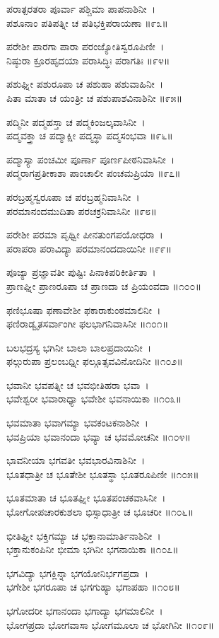 ಪರಾತ್ಪರತರಾ ಪೂರ್ವಾ ಪಶ್ಚಿಮಾ ಪಾಪನಾಶಿನೀ~।\\
ಪಶೂನಾಂ ಪತಿಪತ್ನೀ ಚ ಪತಿಭಕ್ತಿಪರಾಯಣಾ ॥೯೩॥

ಪರೇಶೀ ಪಾರಗಾ ಪಾರಾ ಪರಂಜ್ಯೋತಿಸ್ವರೂಪಿಣೀ~।\\
ನಿಷ್ಠುರಾ ಕ್ರೂರಹೃದಯಾ ಪರಾಸಿದ್ಧಿಃ ಪರಾಗತಿಃ ॥೯೪॥

ಪಶುಘ್ನೀ ಪಶುರೂಪಾ ಚ ಪಶುಹಾ ಪಶುವಾಹಿನೀ~।\\
ಪಿತಾ ಮಾತಾ ಚ ಯಂತ್ರೀ ಚ ಪಶುಪಾಶವಿನಾಶಿನೀ ॥೯೫॥

ಪದ್ಮಿನೀ ಪದ್ಮಹಸ್ತಾ ಚ ಪದ್ಮಕಿಂಜಲ್ಕವಾಸಿನೀ~।\\
ಪದ್ಮವಕ್ತ್ರಾ ಚ ಪದ್ಮಾಕ್ಷೀ ಪದ್ಮಸ್ಥಾ ಪದ್ಮಸಂಭವಾ ॥೯೬॥

ಪದ್ಮಾಸ್ಯಾ ಪಂಚಮೀ ಪೂರ್ಣಾ ಪೂರ್ಣಪೀಠನಿವಾಸಿನೀ~।\\
ಪದ್ಮರಾಗಪ್ರತೀಕಾಶಾ ಪಾಂಚಾಲೀ ಪಂಚಮಪ್ರಿಯಾ ॥೯೭॥

ಪರಬ್ರಹ್ಮಸ್ವರೂಪಾ ಚ ಪರಬ್ರಹ್ಮನಿವಾಸಿನೀ~।\\
ಪರಮಾನಂದಮುದಿತಾ ಪರಚಕ್ರನಿವಾಸಿನೀ ॥೯೮॥

ಪರೇಶೀ ಪರಮಾ ಪೃಥ್ವೀ ಪೀನತುಂಗಪಯೋಧರಾ~।\\
ಪರಾಪರಾ ಪರಾವಿದ್ಯಾ ಪರಮಾನಂದದಾಯಿನೀ ॥೯೯॥

ಪೂಜ್ಯಾ ಪ್ರಜ್ಞಾವತೀ ಪುಷ್ಟಿಃ ಪಿನಾಕಿಪರಿಕೀರ್ತಿತಾ~।\\
ಪ್ರಾಣಘ್ನೀ ಪ್ರಾಣರೂಪಾ ಚ ಪ್ರಾಣದಾ ಚ ಪ್ರಿಯಂವದಾ ॥೧೦೦॥

ಫಣಿಭೂಷಾ ಫಣಾವೇಶೀ ಫಕಾರಾಕುಂಠಮಾಲಿನೀ~।\\
ಫಣಿರಾಡ್ವೃತಸರ್ವಾಂಗೀ ಫಲಭಾಗನಿವಾಸಿನೀ ॥೧೦೧॥

ಬಲಭದ್ರಸ್ಯ ಭಗಿನೀ ಬಾಲಾ ಬಾಲಪ್ರದಾಯಿನೀ~।\\
ಫಲ್ಗುರುಪಾ ಪ್ರಲಂಬಧ್ನೀ ಫಲ್ಗೂತ್ಸವವಿನೋದಿನೀ ॥೧೦೨॥

ಭವಾನೀ ಭವಪತ್ನೀ ಚ ಭವಭೀತಿಹರಾ ಭವಾ~।\\
ಭವೇಶ್ವರೀ ಭವಾರಾಧ್ಯಾ ಭವೇಶೀ ಭವನಾಯಿಕಾ ॥೧೦೩॥

ಭವಮಾತಾ ಭವಾಗಮ್ಯಾ ಭವಕಂಟಕನಾಶಿನೀ~।\\
ಭವಪ್ರಿಯಾ ಭವಾನಂದಾ ಭವ್ಯಾ ಚ ಭವಮೋಚನೀ ॥೧೦೪॥

ಭಾವನೀಯಾ ಭಗವತೀ ಭವಭಾರವಿನಾಶಿನೀ~।\\
ಭೂತಧಾತ್ರೀ ಚ ಭೂತೇಶೀ ಭೂತಸ್ಥಾ ಭೂತರೂಪಿಣೀ ॥೧೦೫॥

ಭೂತಮಾತಾ ಚ ಭೂತಘ್ನೀ ಭೂತಪಂಚಕವಾಸಿನೀ~।\\
ಭೋಗೋಪಚಾರಕುಶಲಾ ಭಿಸ್ಸಾಧಾತ್ರೀ ಚ ಭೂಚರೀ ॥೧೦೬॥

ಭೀತಿಘ್ನೀ ಭಕ್ತಿಗಮ್ಯಾ ಚ ಭಕ್ತಾನಾಮಾರ್ತಿನಾಶಿನೀ~।\\
ಭಕ್ತಾನುಕಂಪಿನೀ ಭೀಮಾ ಭಗಿನೀ ಭಗನಾಯಿಕಾ ॥೧೦೭॥

ಭಗವಿದ್ಯಾ ಭಗಕ್ಲಿನ್ನಾ ಭಗಯೋನಿರ್ಭಗಪ್ರದಾ~।\\
ಭಗೇಶೀ ಭಗರೂಪಾ ಚ ಭಗಗುಹ್ಯಾ ಭಗಾಪಹಾ ॥೧೦೮॥

ಭಗೋದರೀ ಭಗಾನಂದಾ ಭಗಾದ್ಯಾ ಭಗಮಾಲಿನೀ~।\\
ಭೋಗಪ್ರದಾ ಭೋಗವಾಸಾ ಭೋಗಮೂಲಾ ಚ ಭೋಗಿನೀ ॥೧೦೯॥

